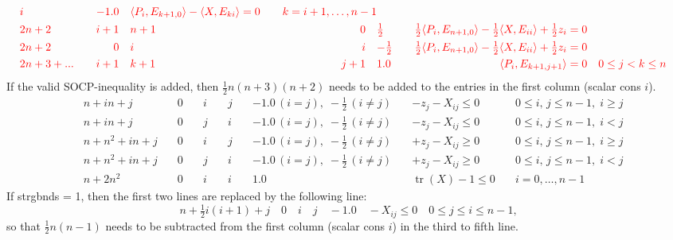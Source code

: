 \documentclass[11pt,a4paper]{article}
\DeclareMathOperator{\tr}{tr}
\theoremstyle{definition}
\begin{document}
{\[\begin{aligned}
    & {\color{red}i} \quad & {\color{red}-1.0} \quad & {\color{red} \langle
      P_i, E_{k+1,0} \rangle - \langle X,E_{ki}\rangle = 0} \quad &
    {\color{red} k = i+1,\dots,n-1} \\    
    &{\color{red}2n+2} \quad &{\color{red}i+1} \quad & {\color{red}n+1} \quad
    & {\color{red}0} \quad & {\color{red}\tfrac{1}{2}} \quad & {\color{red}
      \tfrac{1}{2}\langle P_i, E_{n+1,0} \rangle - \tfrac{1}{2} \langle
      X,E_{ii}\rangle + \tfrac{1}{2}z_i = 0} \quad & \\
    &{\color{red}2n+2} \quad &{\color{red}0} \quad & {\color{red}i} \quad
    & {\color{red}i} \quad & {\color{red}-\tfrac{1}{2}} \quad & {\color{red}
      \tfrac{1}{2}\langle P_i, E_{n+1,0} \rangle - \tfrac{1}{2} \langle
      X,E_{ii}\rangle + \tfrac{1}{2}z_i = 0} \quad & \\
    &{\color{red}2n+3+...} \quad &{\color{red}i+1} \quad & {\color{red}k+1} \quad
    & {\color{red}j+1} \quad & {\color{red}1.0} \quad & {\color{red}
     \langle P_i, E_{k+1,j+1} \rangle = 0} \quad & {\color{red} 0 \leq j < k \leq n}
  \end{aligned}
\]
\noindent
{\color{red} If the valid SOCP-inequality is added, then $\tfrac{1}{2}n(n+3)(n+2)$ needs
to be added to the entries in the first column (scalar cons $i$).}
\[
  \begin{aligned}
    &n+in+j \quad & 0 \quad & i \quad & j \quad & -1.0\,
    (i = j),\; -\tfrac{1}{2}\, (i\neq j) \quad & -z_j - X_{ij} \leq 0 \quad &
    0 \leq i,\, j \leq n-1,\; i \geq j \\
    &n+in+j \quad & 0 \quad & j \quad & i \quad & -1.0\,
    (i = j),\; -\tfrac{1}{2}\, (i\neq j) \quad & -z_j - X_{ij} \leq 0 \quad &
    0 \leq i,\, j \leq n-1,\; i < j \\
    &n+n^2+in+j \quad & 0 \quad & i \quad &
    j \quad & -1.0\, (i = j),\; -\tfrac{1}{2}\, (i\neq j) \quad & +z_j -
    X_{ij} \geq 0 \quad & 0 \leq i,\, j \leq n-1,\; i \geq j \\
    &n+n^2+in+j \quad & 0 \quad & j \quad &
    i \quad & -1.0\, (i = j),\; -\tfrac{1}{2}\, (i\neq j) \quad & +z_j -
    X_{ij} \geq 0 \quad & 0 \leq i,\, j \leq n-1,\; i < j \\
    &n+2n^2 \quad & 0 \quad & i \quad & i \quad & 1.0 \quad & \tr(X) - 1
    \leq 0 \quad & i = 0,\dots,n-1
  \end{aligned}
\]
\noindent
{\color{blue} If strgbnds = 1, then the first two lines are replaced by the
  following line:
  \[
    n+\tfrac{1}{2}i(i+1)+j \quad  0 \quad i \quad  j \quad  -1.0
    \quad - X_{ij} \leq 0 \quad 0 \leq j \leq i \leq n-1,
  \]
  so that $\tfrac{1}{2}n(n-1)$ needs to be subtracted from the first column
  (scalar cons $i$) in the third to fifth line.\\
}

}
\end{document}
